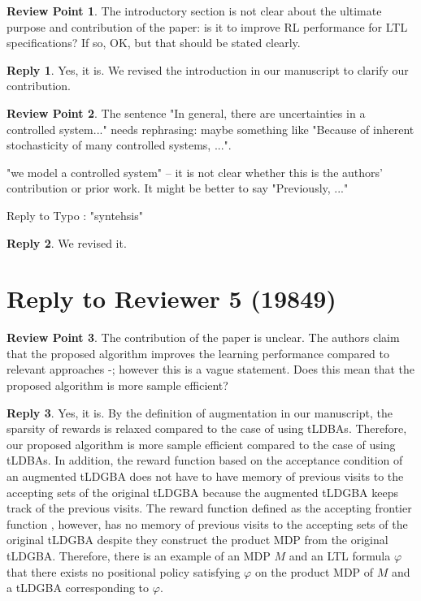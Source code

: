 \documentclass[10 pt, dvipdfmx]{article}
\theoremstyle{definition}
\newtheorem{review point}{Review Point}[section]
\newtheorem*{reply}{Reply}
\begin{document}
\begin{review point}
  The introductory section is not clear about the ultimate purpose and
contribution of the paper: is it to improve RL performance for LTL
specifications? If so, OK, but that should be stated clearly.
\end{review point}

\begin{reply}
  Yes, it is. We revised the introduction in our manuscript to clarify our contribution.
\end{reply}

\begin{review point}
  The sentence "In general, there are uncertainties in a controlled
system..." needs rephrasing: maybe something like "Because of inherent
stochasticity of many controlled systems, ...".

"we model a controlled system" -- it is not clear whether this is the
authors' contribution or prior work. It might be better to say
"Previously, ..."

Reply to Typo : "syntehsis"
\end{review point}

\begin{reply}
  We revised it.
\end{reply}

\section{Reply to Reviewer 5 (19849)}

\begin{review point}
  The contribution of the paper is unclear. The authors claim that the
proposed algorithm improves the learning performance compared to
relevant approaches \cite{Hahn2019}-\cite{BWZP2019}; however this is a vague statement. Does
this mean that the proposed algorithm is more sample efficient?
\end{review point}

\begin{reply}
  Yes, it is. By the definition of augmentation in our manuscript, the sparsity of rewards is relaxed compared to the case of using tLDBAs. Therefore, our proposed algorithm is more sample efficient compared to the case of using tLDBAs. In addition, the reward function based on the acceptance condition of an augmented tLDGBA does not have to have memory of previous visits to the accepting sets of the original tLDGBA because the augmented tLDGBA keeps track of the previous visits. The reward function defined as the accepting frontier function \cite{HAK2019}, however, has no memory of previous visits to the accepting sets of the original tLDGBA despite they construct the product MDP from the original tLDGBA. Therefore, there is an example of an MDP $M$ and an LTL formula $\varphi$ that there exists no positional policy satisfying $\varphi$ on the product MDP of $M$ and a tLDGBA corresponding to $\varphi$.
\end{reply}
\end{document}
